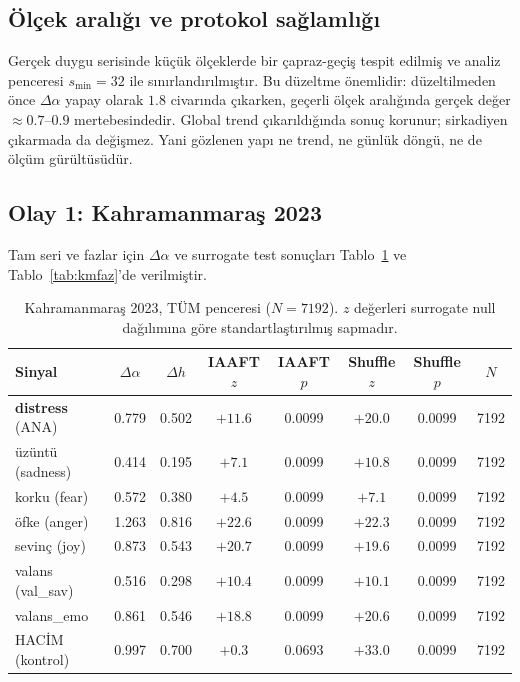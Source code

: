 \documentclass[11pt,a4paper]{article}
\newcommand{\Dal}{\Delta\alpha}
\begin{document}
\subsection{Ölçek aralığı ve protokol sağlamlığı}
\label{sec:olcek}

Gerçek duygu serisinde küçük ölçeklerde bir çapraz-geçiş tespit edilmiş ve
analiz penceresi $s_{\min}=32$ ile sınırlandırılmıştır. Bu düzeltme önemlidir:
düzeltilmeden önce $\Dal$ yapay olarak $1.8$ civarında çıkarken, geçerli
ölçek aralığında gerçek değer $\approx 0.7$--$0.9$ mertebesindedir. Global
trend çıkarıldığında sonuç korunur; sirkadiyen çıkarmada da değişmez. Yani
gözlenen yapı ne trend, ne günlük döngü, ne de ölçüm gürültüsüdür.

\subsection{Olay 1: Kahramanmaraş 2023}

Tam seri ve fazlar için $\Dal$ ve surrogate test sonuçları
Tablo~\ref{tab:km} ve Tablo~\ref{tab:kmfaz}'de verilmiştir.

\begin{table}[H]
\centering
\small
\caption{Kahramanmaraş 2023, TÜM penceresi ($N=7192$). $z$ değerleri
surrogate null dağılımına göre standartlaştırılmış sapmadır.}
\label{tab:km}
\begin{tabular}{lccccccc}
\toprule
Sinyal & $\Dal$ & $\Delta h$ & IAAFT $z$ & IAAFT $p$ & Shuffle $z$ & Shuffle $p$ & $N$\\
\midrule
\textbf{distress} (ANA) & 0.779 & 0.502 & $+11.6$ & 0.0099 & $+20.0$ & 0.0099 & 7192\\
üzüntü (sadness)      & 0.414 & 0.195 & $+7.1$  & 0.0099 & $+10.8$ & 0.0099 & 7192\\
korku (fear)           & 0.572 & 0.380 & $+4.5$  & 0.0099 & $+7.1$  & 0.0099 & 7192\\
öfke (anger)           & 1.263 & 0.816 & $+22.6$ & 0.0099 & $+22.3$ & 0.0099 & 7192\\
sevinç (joy)           & 0.873 & 0.543 & $+20.7$ & 0.0099 & $+19.6$ & 0.0099 & 7192\\
valans (val\_sav)      & 0.516 & 0.298 & $+10.4$ & 0.0099 & $+10.1$ & 0.0099 & 7192\\
valans\_emo            & 0.861 & 0.546 & $+18.8$ & 0.0099 & $+20.6$ & 0.0099 & 7192\\
\midrule
HACİM (kontrol)        & 0.997 & 0.700 & $+0.3$  & 0.0693 & $+33.0$ & 0.0099 & 7192\\
\bottomrule
\end{tabular}
\end{table}
\end{document}

